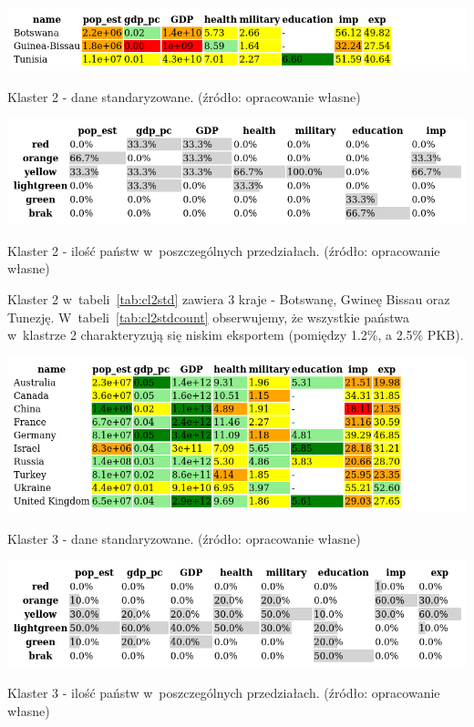 \documentclass[11pt]{report}
\begin{document}
    \begin{table}[!htp]
        \centering
        \includegraphics[width=\linewidth]{tables/CLUST/cluster2stdkmeans.png}
        \caption{Klaster 2 - dane standaryzowane. (źródło: opracowanie własne)}
        \label{tab:cl2std}
    \end{table}

    \begin{table}[!htp]
        \centering
        \includegraphics[width=\linewidth]{tables/CLUST/cluster2stdkmeanscount.png}
        \caption{Klaster 2 - ilość państw w~poszczególnych przedziałach. (źródło: opracowanie własne)}
        \label{tab:cl2stdcount}
    \end{table}

    Klaster 2 w~tabeli~\ref{tab:cl2std} zawiera 3 kraje - Botswanę, Gwineę Bissau oraz Tunezję.
    W~tabeli~\ref{tab:cl2stdcount} obserwujemy, że wszystkie państwa w~klastrze 2 charakteryzują się niskim eksportem (pomiędzy 1.2\%, a 2.5\% PKB).

    \begin{table}[!htp]
        \centering
        \includegraphics[width=\linewidth]{tables/CLUST/cluster3stdkmeans.png}
        \caption{Klaster 3 - dane standaryzowane. (źródło: opracowanie własne)}
        \label{tab:cl3std}
    \end{table}

    \begin{table}[!htp]
        \centering
        \includegraphics[width=\linewidth]{tables/CLUST/cluster3stdkmeanscount.png}
        \caption{Klaster 3 - ilość państw w~poszczególnych przedziałach. (źródło: opracowanie własne)}
        \label{tab:cl3stdcount}
    \end{table}
\end{document}
